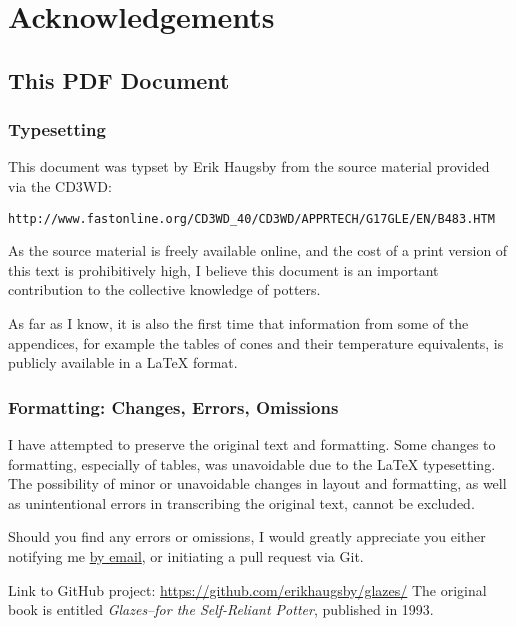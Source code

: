 \chapter*{Acknowledgements}
\section*{This PDF Document}
\subsection*{Typesetting}
This document was typset by Erik Haugsby from the source material provided 
via the CD3WD:
\begin{verbatim}
http://www.fastonline.org/CD3WD_40/CD3WD/APPRTECH/G17GLE/EN/B483.HTM
\end{verbatim}
As the source material is freely available online, and the cost of a print 
version of this text is prohibitively high, I believe this document is an 
important contribution to the collective knowledge of potters.

As far as I know, it is also the first time that information from some of the 
appendices, for example the tables of cones and their temperature equivalents, 
is publicly available in a LaTeX format.
\subsection*{Formatting: Changes, Errors, Omissions}
I have attempted to preserve the original text and formatting. Some changes to 
formatting, especially of tables, was unavoidable due to the LaTeX typesetting. 
The possibility of minor or unavoidable changes in layout and formatting, as 
well as unintentional errors in transcribing the original text, cannot be 
excluded.

Should you find any errors or omissions, I would greatly appreciate you either 
notifying me \href{mailto:e@erikhaugsby.com}{by email}, or initiating a pull 
request via Git. 

Link to GitHub project: 
\href{https://github.com/erikhaugsby/glazes/}{https://github.com/erikhaugsby/glazes/}
The original book is entitled \textit{Glazes--for the Self-Reliant Potter}, 
published in 1993.
